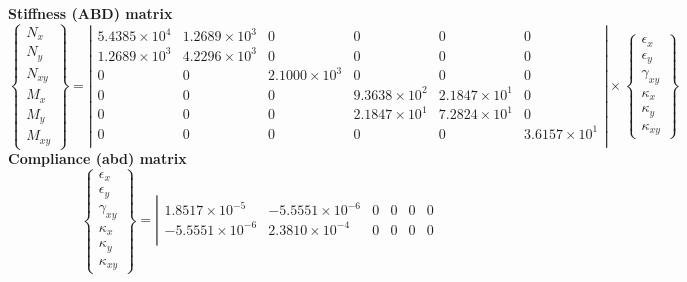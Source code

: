\begin{table}[!htbp]
  \vbox{
    \vbox{\small\textbf{Stiffness (ABD) matrix}\\[-5mm]
      \tiny\[\left\{\begin{array}{c}
          N_x\\ N_y\\ N_{xy}\\ M_x\\ M_y\\ M_{xy}
        \end{array}\right\} = 
      \left|\begin{array}{cccccc}
           5.4385\times 10^{4} &  1.2689\times 10^{3} & 0 & 0 & 0 & 0\\
           1.2689\times 10^{3} &  4.2296\times 10^{3} & 0 & 0 & 0 & 0\\
          0 & 0 &  2.1000\times 10^{3} & 0 & 0 & 0\\
          0 & 0 & 0 &  9.3638\times 10^{2} &  2.1847\times 10^{1} & 0\\
          0 & 0 & 0 &  2.1847\times 10^{1} &  7.2824\times 10^{1} & 0\\
          0 & 0 & 0 & 0 & 0 &  3.6157\times 10^{1}\\
          \end{array}\right| \times
        \left\{\begin{array}{c}
            \epsilon_x\\[3pt] \epsilon_y\\[3pt] \gamma_{xy}\\[3pt]
            \kappa_x\\[3pt] \kappa_y\\[3pt] \kappa_{xy}
          \end{array}\right\}\]
    }
    \vbox{\small\textbf{Compliance (abd) matrix}\\[-5mm]
      \tiny\[\left\{\begin{array}{c}
            \epsilon_x\\[3pt] \epsilon_y\\[3pt] \gamma_{xy}\\[3pt]
            \kappa_x\\[3pt] \kappa_y\\[3pt] \kappa_{xy}
          \end{array}\right\} = \left|\begin{array}{cccccc}
           1.8517\times 10^{-5} & -5.5551\times 10^{-6} & 0 & 0 & 0 & 0\\
          -5.5551\times 10^{-6} &  2.3810\times 10^{-4} & 0 & 0 & 0 & 0\\

\end{array}\]}}
\end{table}
